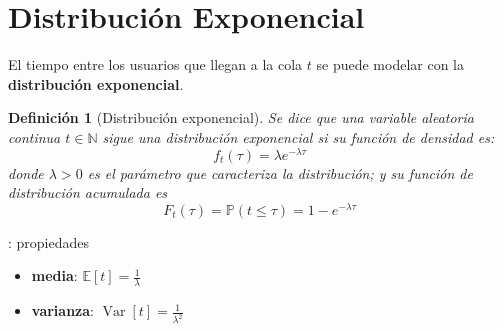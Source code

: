 \documentclass[xcolor={x11names}]{beamer}
\DeclareMathOperator{\Var}{Var}
\newtheorem{definicion}{Definición}[section]
\newcommand{\blue}[1]{{\color{blue}#1}}
\begin{document}
\section{Distribución Exponencial}

\begin{frame}{\secname}
    \begin{figure}
        
    \end{figure}
    El tiempo entre los usuarios que
    llegan a la cola \blue{$t$} se puede
    modelar con la \textbf{distribución exponencial}.
\end{frame}



\begin{frame}{\secname}
    \begin{definicion}[Distribución exponencial]
        Se dice que una variable aleatoria
        continua $t\in\mathbb{N}$ sigue una
        distribución exponencial si su
        función de densidad es:
        \begin{equation}
            f_t(\tau) = \lambda e^{-\lambda \tau}
        \end{equation}
        donde $\lambda>0$ es el parámetro
        que caracteriza la distribución;
        y su función de distribución
        acumulada es
        \begin{equation}
            F_t(\tau) = \mathbb{P}(t\leq\tau) = 1- e^{-\lambda \tau}
        \end{equation}
    \end{definicion}
\end{frame}




\begin{frame}{\secname: propiedades}
    \begin{figure}
        
    \end{figure}


    \begin{itemize}
        \item \textbf{media}: $\mathbb{E}[t]=\tfrac{1}{\lambda}$
        \item \textbf{varianza}: $\Var[t]=\tfrac{1}{\lambda^2}$
    \end{itemize}
\end{frame}
\end{document}
